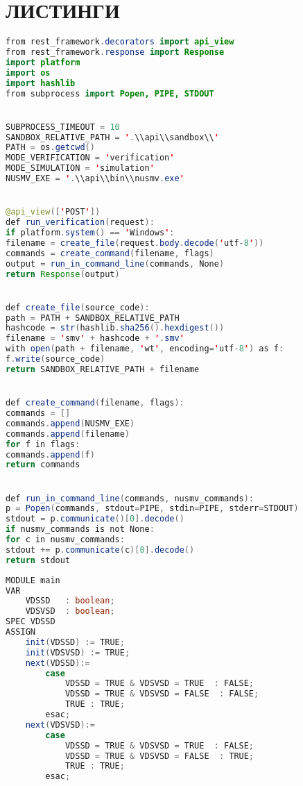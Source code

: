 \chapter{ЛИСТИНГИ}

\begin{lstlisting}[language=Java, 
label=lst:url_assign, 
caption={Обработка запроса на верификацию.}]
from rest_framework.decorators import api_view
from rest_framework.response import Response
import platform
import os
import hashlib
from subprocess import Popen, PIPE, STDOUT


SUBPROCESS_TIMEOUT = 10
SANDBOX_RELATIVE_PATH = '.\\api\\sandbox\\'
PATH = os.getcwd()
MODE_VERIFICATION = 'verification'
MODE_SIMULATION = 'simulation'
NUSMV_EXE = '.\\api\\bin\\nusmv.exe'


@api_view(['POST'])
def run_verification(request):
if platform.system() == 'Windows':
filename = create_file(request.body.decode('utf-8'))
commands = create_command(filename, flags)
output = run_in_command_line(commands, None)
return Response(output)


def create_file(source_code):
path = PATH + SANDBOX_RELATIVE_PATH
hashcode = str(hashlib.sha256().hexdigest())
filename = 'smv' + hashcode + '.smv'
with open(path + filename, 'wt', encoding='utf-8') as f:
f.write(source_code)
return SANDBOX_RELATIVE_PATH + filename


def create_command(filename, flags):
commands = []
commands.append(NUSMV_EXE)
commands.append(filename)
for f in flags:
commands.append(f)
return commands


def run_in_command_line(commands, nusmv_commands):
p = Popen(commands, stdout=PIPE, stdin=PIPE, stderr=STDOUT)
stdout = p.communicate()[0].decode()
if nusmv_commands is not None:
for c in nusmv_commands:
stdout += p.communicate(c)[0].decode()
return stdout
\end{lstlisting}

\begin{lstlisting}[language=Java, 
label=lst:url_assign, 
caption={Пример сгенерированного SMV-кода.}]
MODULE main
VAR
	VDSSD	: boolean;
	VDSVSD	: boolean;
SPEC VDSSD
ASSIGN
	init(VDSSD) := TRUE;
	init(VDSVSD) := TRUE;
	next(VDSSD):=
		case
			VDSSD = TRUE & VDSVSD = TRUE  : FALSE;
			VDSSD = TRUE & VDSVSD = FALSE  : FALSE;
			TRUE : TRUE;
		esac;
	next(VDSVSD):=
		case
			VDSSD = TRUE & VDSVSD = TRUE  : FALSE;
			VDSSD = TRUE & VDSVSD = FALSE  : TRUE;
			TRUE : TRUE;
		esac;
\end{lstlisting}

